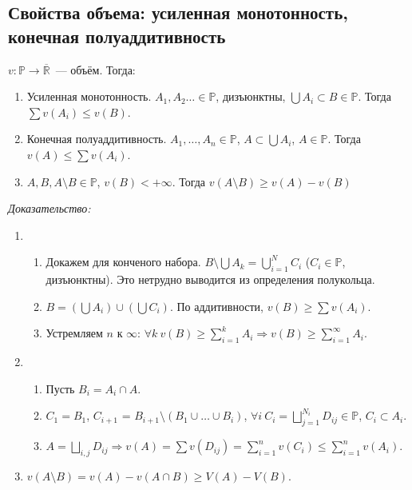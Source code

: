 \documentclass[paper=a4, fontsize=11pt]{article}
\begin{document}
\subsection{Свойства объема: усиленная монотонность, конечная полуаддитивность}
$v: \mathds{P} \rightarrow \overline{\mathds{R}}$~--- объём. Тогда:
\begin{enumerate}
    \item Усиленная монотонность. $A_1,A_2\dots \in \mathds{P}$, дизъюнктны, $\bigcup A_i \subset B \in \mathds{P}$.
    Тогда $\sum v(A_i) \leq v(B)$.
    \item Конечная полуаддитивность. $A_1,\dots,A_n \in \mathds{P}$, $A \subset \bigcup A_i$, $A \in \mathds{P}$.
    Тогда $v(A) \leq \sum v(A_i)$.
    \item $A,B, A \setminus B \in \mathds{P}$, $v(B) < +\infty$.
    Тогда $v(A \setminus B) \geq v(A) - v(B)$
\end{enumerate}

\emph{Доказательство:}
\begin{enumerate}
    \item
    \begin{enumerate}
        \item Докажем для конченого набора. $B \setminus \bigcup A_k = \bigcup_{i=1}^N C_i$ ($C_i \in \mathds{P}$, дизъюнктны).
        Это нетрудно выводится из определения полукольца.
        \item $B = (\bigcup A_i) \cup (\bigcup C_i)$. По аддитивности, $v(B) \geq \sum v(A_i)$.
        \item Устремляем $n$ к $\infty$: $\forall k\ v(B) \geq \sum_{i=1}^k A_i \Rightarrow v(B) \geq \sum_{i=1}^{\infty} A_i$.
    \end{enumerate}
    \item
    \begin{enumerate}
        \item Пусть $B_i = A_i \cap A$.
        \item $C_1 = B_1$, $C_{i+1}$ = $B_{i+1} \setminus (B_1 \cup \dots \cup B_i)$,
        $\forall i\ C_i = \bigsqcup_{j=1}^{N_i} D_{ij} \in \mathds{P}$, $C_i \subset A_i$.
        \item $A = \bigsqcup_{i,j} D_{ij} \Rightarrow v(A) = \sum v(D_{ij}) = \sum_{i=1}^n v(C_i) \leq \sum_{i=1}^n v(A_i)$.
    \end{enumerate}
    \item $v(A \setminus B) = v(A) - v(A \cap B) \geq V(A) - V(B)$.
\end{enumerate}
\end{document}
